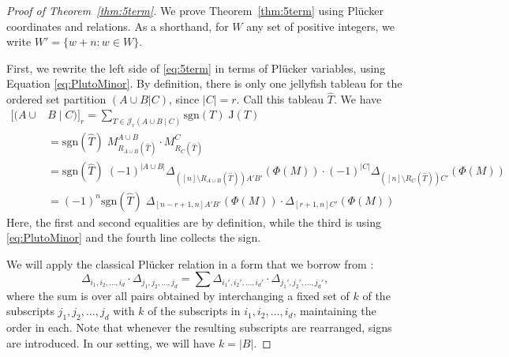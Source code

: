 \documentclass[ALCO, Unicode]{cedram}
\numberwithin{equation}{section}
\newcommand{\rstab}{\mathcal{J}}
\newcommand{\rspoly}{\mathrm{J}}
\newcommand{\sgn}{\mathrm{sgn}}
\begin{document}
\begin{proof}[Proof of Theorem~\ref{thm:5term}]
        We prove Theorem~\ref{thm:5term} using Pl\"ucker coordinates and relations. As a shorthand, for $W$ any set of positive integers, we write $W' = \{w + n : w \in W\}$.
        
    First, we rewrite the left side of \eqref{eq:5term} in terms of Pl\"ucker variables, using Equation \eqref{eq:PlutoMinor}.  By definition, there is only one jellyfish tableau for the ordered set partition $(A\cup B | C)$, since $|C|=r$. Call this tableau $\widehat{T}$.
    We have
    \begin{equation}\label{eq:expand_the_jellyfish_inv}
    \begin{split}
            \big[(A\cup & B \mid C)\big]_r = \sum_{T\in \rstab_r(A\cup B \mid C)}\sgn(T) \; \rspoly(T)  \\
          &=  \sgn(\widehat{T}) \;  M_{R_{A \cup B}(\widehat{T})}^{A \cup B} \cdot M_{R_C(\widehat{T})}^{C} \\
          &=  \sgn(\widehat{T}) \; (-1)^{|A \cup B|} \Delta_{([n]\setminus R_{A \cup B}(\widehat{T}))  A' B'}(\Phi(M)) \cdot (-1)^{|C|}\Delta_{([n]\setminus R_C(\widehat{T}))  C'}(\Phi(M))\\
          &= (-1)^n \sgn(\widehat{T}) \;  \Delta_{[n-r + 1, n]  A' B'}(\Phi(M)) \cdot \Delta_{[r+1, n]  C'}(\Phi(M))
    \end{split}
      \end{equation}
Here, the first and second equalities are by definition, while the third is using \eqref{eq:PlutoMinor} and the fourth line collects the sign.

We will apply the classical Pl\"ucker relation in a form that we borrow from \cite[Eqn.~9.1]{Fulton:YoungTableaux}:
\begin{equation}\label{eq:Fulton}
\Delta_{i_1,i_2,\ldots,i_d}\cdot\Delta_{j_1,j_2,\ldots,j_d}=\sum\Delta_{i_1',i_2',\ldots,i_d'}\cdot\Delta_{j_1',j_2',\ldots,j_d'},
\end{equation}
where the sum is over all pairs obtained by interchanging a fixed set of $k$ of the subscripts $j_1,j_2,\ldots,j_d$ with $k$ of the subscripts in $i_1,i_2,\ldots,i_d$, maintaining the order in each. Note that whenever the resulting subscripts are rearranged, signs are introduced. In our setting, we will have $k = |B|$. 


\end{proof}
\end{document}
